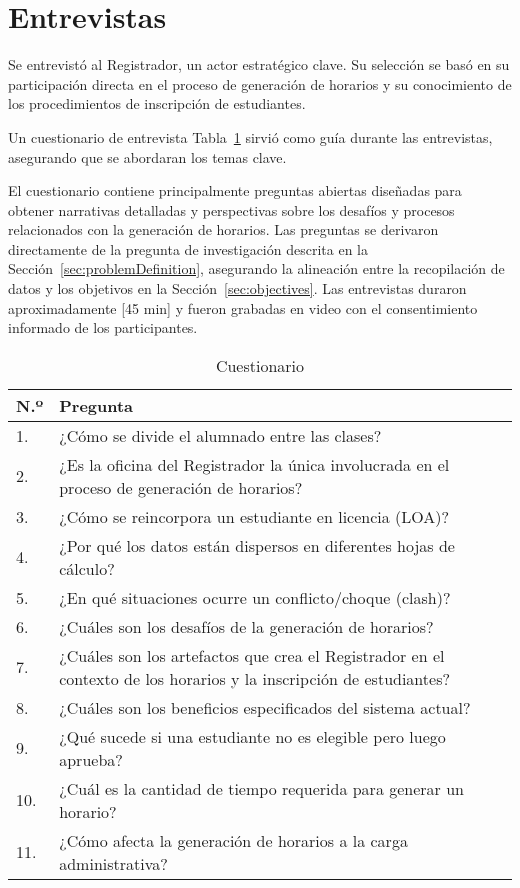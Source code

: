 \section{Entrevistas}
\label{sec:appendixInterviews}

Se entrevistó al Registrador, un actor estratégico clave.
Su selección se basó en su participación directa en el proceso de generación de horarios y su conocimiento de los procedimientos de inscripción de estudiantes.

Un cuestionario de entrevista Tabla~\ref{tab:questionaree} sirvió como guía durante las entrevistas, asegurando que se abordaran los temas clave.

El cuestionario contiene principalmente preguntas abiertas diseñadas para obtener narrativas detalladas y perspectivas sobre los desafíos y procesos relacionados con la generación de horarios.
Las preguntas se derivaron directamente de la pregunta de investigación descrita en la Sección~\ref{sec:problemDefinition}, asegurando la alineación entre la recopilación de datos y los objetivos en la Sección~\ref{sec:objectives}.
Las entrevistas duraron aproximadamente [45 min] y fueron grabadas en video con el consentimiento informado de los participantes.

\begin{table}[h]
    \caption{Cuestionario}\label{tab:questionaree}
    \begin{tabularx}{\textwidth}{lX}
        \toprule
        \textbf{N.º} &  \textbf{Pregunta}\\
        \midrule
        1. & ¿Cómo se divide el alumnado entre las clases? \\
        2. & ¿Es la oficina del Registrador la única involucrada en el proceso de generación de horarios?\\
        3. & ¿Cómo se reincorpora un estudiante en licencia (LOA)?\\
        4. & ¿Por qué los datos están dispersos en diferentes hojas de cálculo?\\
        5. & ¿En qué situaciones ocurre un conflicto/choque (clash)?\\
        6. & ¿Cuáles son los desafíos de la generación de horarios?\\
        7. & ¿Cuáles son los artefactos que crea el Registrador en el contexto de los horarios y la inscripción de estudiantes?\\
        8. & ¿Cuáles son los beneficios especificados del sistema actual?\\
        9. & ¿Qué sucede si una estudiante no es elegible pero luego aprueba?\\
        10. & ¿Cuál es la cantidad de tiempo requerida para generar un horario?\\
        11. & ¿Cómo afecta la generación de horarios a la carga administrativa?\\
        \bottomrule
    \end{tabularx}
\end{table}


